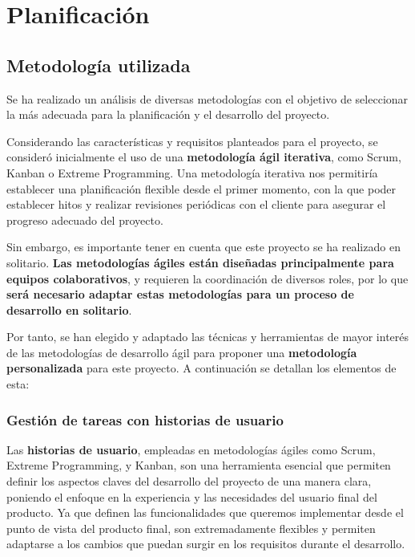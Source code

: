 \chapter{Planificación}

\section{Metodología utilizada}

Se ha realizado un análisis de diversas metodologías con el objetivo de seleccionar la más adecuada para la planificación y el desarrollo del proyecto. 

Considerando las características y requisitos planteados para el proyecto, se consideró inicialmente el uso de una \textbf{metodología ágil iterativa}, como Scrum\cite{scrum}, Kanban\cite{kanban} o Extreme Programming\cite{xp}. Una metodología iterativa nos permitiría establecer una planificación flexible desde el primer momento, con la que poder establecer hitos y realizar revisiones periódicas con el cliente para asegurar el progreso adecuado del proyecto.

Sin embargo, es importante tener en cuenta que este proyecto se ha realizado en solitario. \textbf{Las metodologías ágiles están diseñadas principalmente para equipos colaborativos}, y requieren la coordinación de diversos roles, por lo que \textbf{será necesario adaptar estas metodologías para un proceso de desarrollo en solitario}.

Por tanto, se han elegido y adaptado las técnicas y herramientas de mayor interés de las metodologías de desarrollo ágil para proponer una \textbf{metodología personalizada} para este proyecto. A continuación se detallan los elementos de esta: 

\subsection{Gestión de tareas con historias de usuario}

Las \textbf{historias de usuario}, empleadas en metodologías ágiles como Scrum, Extreme Programming, y Kanban, son una herramienta esencial que permiten definir los aspectos claves del desarrollo del proyecto de una manera clara, poniendo el enfoque en la experiencia y las necesidades del usuario final del producto. Ya que definen las funcionalidades que queremos implementar desde el punto de vista del producto final, son extremadamente flexibles y permiten adaptarse a los cambios que puedan surgir en los requisitos durante el desarrollo.

